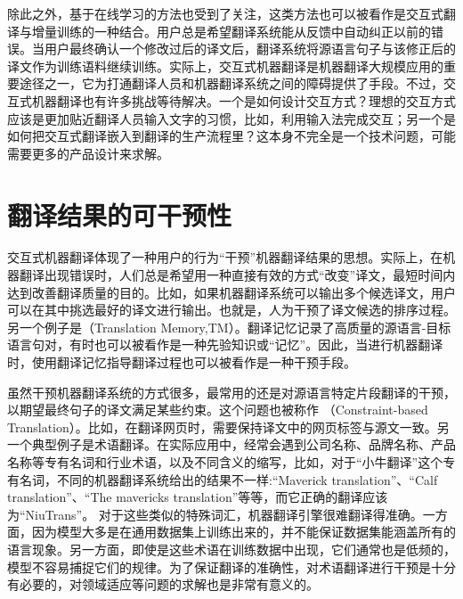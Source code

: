 \parinterval 除此之外，基于在线学习的方法也受到了关注，这类方法也可以被看作是交互式翻译与增量训练的一种结合。用户总是希望翻译系统能从反馈中自动纠正以前的错误。当用户最终确认一个修改过后的译文后，翻译系统将源语言句子与该修正后的译文作为训练语料继续训练。实际上，交互式机器翻译是机器翻译大规模应用的重要途径之一，它为打通翻译人员和机器翻译系统之间的障碍提供了手段。不过，交互式机器翻译也有许多挑战等待解决。一个是如何设计交互方式？理想的交互方式应该是更加贴近翻译人员输入文字的习惯，比如，利用输入法完成交互；另一个是如何把交互式翻译嵌入到翻译的生产流程里？这本身不完全是一个技术问题，可能需要更多的产品设计来求解。


\sectionnewpage
\section{翻译结果的可干预性}

\parinterval 交互式机器翻译体现了一种用户的行为“干预”机器翻译结果的思想。实际上，在机器翻译出现错误时，人们总是希望用一种直接有效的方式“改变”译文，最短时间内达到改善翻译质量的目的。比如，如果机器翻译系统可以输出多个候选译文，用户可以在其中挑选最好的译文进行输出。也就是，人为干预了译文候选的排序过程。另一个例子是{\small{}}（Translation Memory,TM）。翻译记忆记录了高质量的源语言-目标语言句对，有时也可以被看作是一种先验知识或“记忆”。因此，当进行机器翻译时，使用翻译记忆指导翻译过程也可以被看作是一种干预手段。


\parinterval 虽然干预机器翻译系统的方式很多，最常用的还是对源语言特定片段翻译的干预，以期望最终句子的译文满足某些约束。这个问题也被称作{\small{}} （Constraint-based Translation）。比如，在翻译网页时，需要保持译文中的网页标签与源文一致。另一个典型例子是术语翻译。在实际应用中，经常会遇到公司名称、品牌名称、产品名称等专有名词和行业术语，以及不同含义的缩写，比如，对于“小牛翻译”这个专有名词，不同的机器翻译系统给出的结果不一样:“Maverick translation”、“Calf translation”、“The mavericks translation”等等，而它正确的翻译应该为“NiuTrans”。 对于这些类似的特殊词汇，机器翻译引擎很难翻译得准确。一方面，因为模型大多是在通用数据集上训练出来的，并不能保证数据集能涵盖所有的语言现象。另一方面，即使是这些术语在训练数据中出现，它们通常也是低频的，模型不容易捕捉它们的规律。为了保证翻译的准确性，对术语翻译进行干预是十分有必要的，对领域适应等问题的求解也是非常有意义的。

